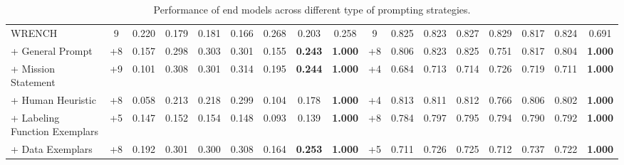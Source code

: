 \begin{table}[h!]
{\begin{tabular}{@{}l|cccccccc|cccccccc@{}}
WRENCH & 9 & 0.220 & 0.179 & 0.181 & 0.166 & 0.268 & 0.203 & 0.258 & 9 & 0.825 & 0.823 & 0.827 & 0.829 & 0.817 & 0.824 & 0.691 \\
+ General Prompt & +8 & 0.157 & 0.298 & 0.303 & 0.301 & 0.155 & \textbf{0.243} & \textbf{1.000} & +8 & 0.806 & 0.823 & 0.825 & 0.751 & 0.817 & 0.804 & \textbf{1.000} \\
+ Mission Statement & +9 & 0.101 & 0.308 & 0.301 & 0.314 & 0.195 & \textbf{0.244} & \textbf{1.000} & +4 & 0.684 & 0.713 & 0.714 & 0.726 & 0.719 & 0.711 & \textbf{1.000} \\
+ Human Heuristic & +8 & 0.058 & 0.213 & 0.218 & 0.299 & 0.104 & 0.178 & \textbf{1.000} & +4 & 0.813 & 0.811 & 0.812 & 0.766 & 0.806 & 0.802 & \textbf{1.000} \\
+ Labeling Function Exemplars & +5 & 0.147 & 0.152 & 0.154 & 0.148 & 0.093 & 0.139 & \textbf{1.000} & +8 & 0.784 & 0.797 & 0.795 & 0.794 & 0.790 & 0.792 & \textbf{1.000} \\
+ Data Exemplars & +8 & 0.192 & 0.301 & 0.300 & 0.308 & 0.164 & \textbf{0.253} & \textbf{1.000} & +5 & 0.711 & 0.726 & 0.725 & 0.712 & 0.737 & 0.722 & \textbf{1.000} \\ \bottomrule
\end{tabular}}
\centering\caption{Performance of end models across different type of prompting strategies.}
\label{end model perf}
\end{table}


